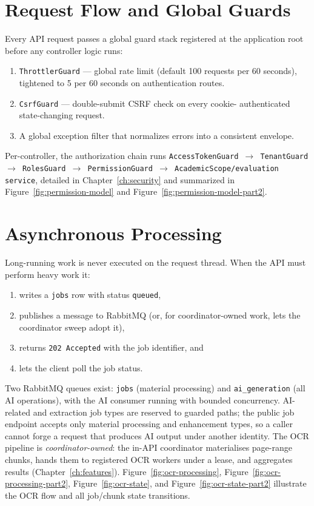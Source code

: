 \section{Request Flow and Global Guards}

\noindent Every API request passes a global guard stack registered at the
application root before any controller logic runs:

\begin{enumerate}
  \item \texttt{ThrottlerGuard} --- global rate limit (default 100 requests
  per 60 seconds), tightened to 5 per 60 seconds on authentication routes.
  \item \texttt{CsrfGuard} --- double-submit CSRF check on every cookie-
  authenticated state-changing request.
  \item A global exception filter that normalizes errors into a consistent
  envelope.
\end{enumerate}

\noindent Per-controller, the authorization chain runs
\texttt{AccessTokenGuard $\rightarrow$ TenantGuard $\rightarrow$
RolesGuard $\rightarrow$ PermissionGuard $\rightarrow$ AcademicScope/evaluation
service}, detailed in Chapter~\ref{ch:security} and summarized in
Figure~\ref{fig:permission-model} and Figure~\ref{fig:permission-model-part2}.

\section{Asynchronous Processing}

\noindent Long-running work is never executed on the request thread. When the
API must perform heavy work it:

\begin{enumerate}
  \item writes a \texttt{jobs} row with status \texttt{queued},
  \item publishes a message to RabbitMQ (or, for coordinator-owned work,
  lets the coordinator sweep adopt it),
  \item returns \texttt{202 Accepted} with the job identifier, and
  \item lets the client poll the job status.
\end{enumerate}

\noindent Two RabbitMQ queues exist: \texttt{jobs} (material processing) and
\texttt{ai\_generation} (all AI operations), with the AI consumer running with
bounded concurrency. AI-related and extraction job types are reserved to
guarded paths; the public job endpoint accepts only material processing and
enhancement types, so a caller cannot forge a request that produces AI output
under another identity. The OCR pipeline is \emph{coordinator-owned}: the
in-API coordinator materialises page-range chunks, hands them to registered
OCR workers under a lease, and aggregates results (Chapter~\ref{ch:features}).
Figure~\ref{fig:ocr-processing}, Figure~\ref{fig:ocr-processing-part2},
Figure~\ref{fig:ocr-state}, and Figure~\ref{fig:ocr-state-part2} illustrate
the OCR flow and all job/chunk state transitions.

